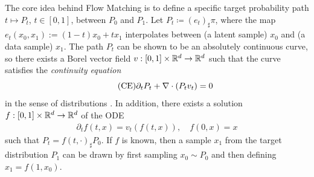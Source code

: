 \documentclass{article} %
\newcommand{\dd}{\mathrm{d}}
\theoremstyle{definition}
\begin{document}
The core idea behind Flow Matching is to define a specific target probability path $t \mapsto P_t$, $t \in [0,1]$, between $P_0$ and $P_1$. Let $P_t \coloneqq (e_t)_\sharp \pi$, where the map $e_t(x_0, x_1) := (1-t)x_0 + tx_1$ interpolates between (a latent sample) $x_0$ and (a data sample) $x_1$.
The path $P_t$ can be shown to be an absolutely continuous curve, so there exists a Borel vector field 
$v:[0,1]\times \mathbb{R}^d\to\mathbb{R}^d$ 
such that the curve satisfies the \emph{continuity equation} 
\begin{equation}\label{eq:continuity}\tag{\text{CE}}
\partial_t P_t +  \nabla\cdot(P_t v_t) = 0
\end{equation}
in the sense of distributions \citep{ambrosio2008}. 
In addition, there exists a solution 
$f:[0,1] \times \mathbb{R}^d \to \mathbb{R}^d$ of the ODE
\begin{align}\label{eq:flow_ode}
\partial_t f(t,x)=v_t(f(t,x)), \quad f(0,x)=x
\end{align}
such that $P_t = f(t, \cdot)_\sharp P_0$. If $f$ is known, then a sample $x_1$ from the target distribution $P_1$ can be drawn by first sampling $x_0 \sim P_0$ and then defining $x_1 = f(1, x_0)$.
\end{document}
